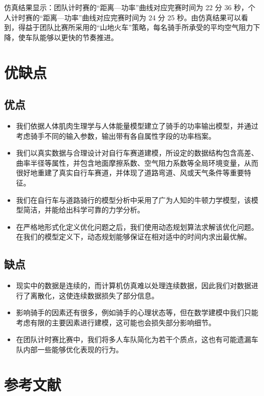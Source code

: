 \documentclass[11pt,a4paper]{ctexart}
\begin{document}
仿真结果显示：团队计时赛的“距离—功率”曲线对应完赛时间为 22 分 36 秒，个人计时赛的“距离—功率”曲线对应完赛时间为 24 分 25 秒。由仿真结果可以看到，得益于团队比赛所采用的“山地火车”策略，每名骑手所承受的平均空气阻力下降，使车队能够以更快的节奏推进。

\section{优缺点}

\subsection{优点}

\begin{itemize}
\item 我们依据人体肌肉生理学与人体能量模型建立了骑手的功率输出模型，并通过考虑骑手不同的输入参数，输出带有各自属性字段的功率档案。
\item 我们以真实数据与合理设计对自行车赛道建模，所设定的数据结构包含高差、曲率半径等属性，并包含地面摩擦系数、空气阻力系数等全局环境变量，从而很好地重建了真实自行车赛道，并体现了道路弯道、风或天气条件等重要特征。
\item 我们在自行车与道路骑行的模型分析中采用了广为人知的牛顿力学模型，该模型简洁，并能给出科学可靠的力学分析。
\item 在严格地形式化定义优化问题之后，我们使用动态规划算法求解该优化问题。在我们的模型定义下，动态规划能够保证在相对适中的时间内求出最优解。
\end{itemize}

\subsection{缺点}

\begin{itemize}
\item 现实中的数据是连续的，而计算机仿真难以处理连续数据，因此我们对数据进行了离散化，这使连续数据损失了部分信息。
\item 影响骑手的因素还有很多，例如骑手的心理状态等，但在数学建模中我们只能考虑有限的主要因素进行建模，这可能也会损失部分影响细节。
\item 在团队计时赛比赛中，我们将多人车队简化为若干个质点，这也有可能遗漏车队内部一些能够优化表现的行为。
\end{itemize}

\section*{参考文献}
\end{document}
